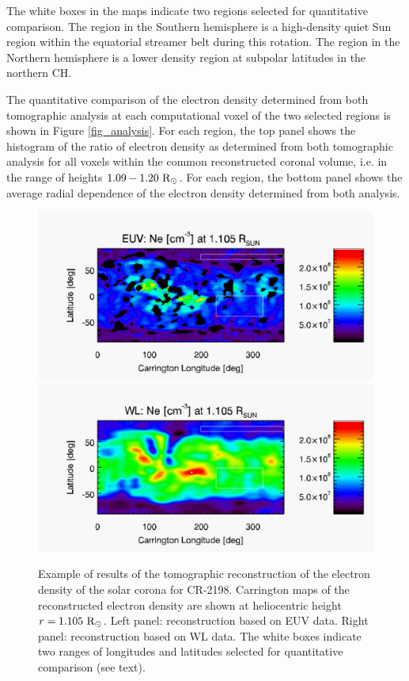 \documentclass[baaa]{baaa}
\begin{document}
The white boxes in the maps indicate two regions selected for quantitative comparison. The region in the Southern hemisphere is a high-density quiet Sun region within the equatorial streamer belt during this rotation. The region in the Northern hemisphere is a lower density region at subpolar latitudes in the northern CH.

The quantitative comparison of the electron density determined from both tomographic analysis at each computational voxel of the two selected regions is shown in Figure \ref{fig_analysis}. For each region, the top panel shows the histogram of the ratio of electron density as determined from both tomographic analysis for all voxels within the common reconstructed coronal volume, i.e. in the range of heights $1.09-1.20~\rm{R}_\odot$.
For each region, the bottom panel shows the average radial dependence of the electron density determined from both analysis.

\begin{figure}[t]
  \centering
  \includegraphics[width=\columnwidth]{map_ne_aia.pdf}
  \includegraphics[width=\columnwidth]{map_ne_kcor.pdf}
  \caption{Example of results of the tomographic reconstruction of the electron density of the solar corona for CR-2198. Carrington maps of the reconstructed electron density are shown at heliocentric height $r=1.105~\rm{R}_\odot$. Left panel: reconstruction based on EUV data. Right panel: reconstruction based on WL data. The white boxes indicate two ranges of longitudes and latitudes selected for quantitative comparison (see text).}
  \label{fig_maps}
\end{figure}
\end{document}
